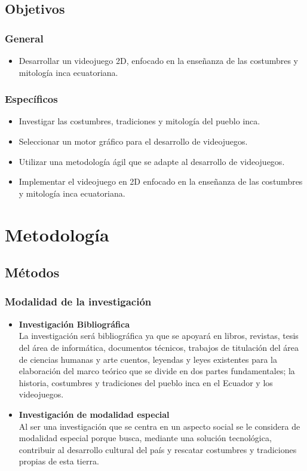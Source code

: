 \documentclass[a4paper, openright, 12pt]{report}
\begin{document}
\section{Objetivos}
\subsection{General}
\begin{itemize}
\item Desarrollar un videojuego 2D, enfocado en la enseñanza de las costumbres y mitología inca ecuatoriana.
\end{itemize}

\subsection{Específicos}
\begin{itemize}
\item Investigar las costumbres, tradiciones y mitología del pueblo inca.
\item Seleccionar un motor gráfico para el desarrollo de videojuegos.
\item Utilizar una metodología ágil que se adapte al desarrollo de videojuegos.
\item Implementar el videojuego en 2D enfocado en la enseñanza de las costumbres y mitología inca ecuatoriana.
\end{itemize}
\chapter{Metodología}
\section{Métodos}
\subsection{Modalidad de la investigación}
\begin{itemize}
\item \textbf{Investigación Bibliográfica}\\
La investigación será bibliográfica ya que se apoyará en libros, revistas, tesis del área de informática, documentos técnicos, trabajos de titulación del área de ciencias humanas y arte cuentos, leyendas y leyes existentes para la elaboración del marco teórico que se divide en dos partes fundamentales; la historia, costumbres y tradiciones del pueblo inca en el Ecuador y los videojuegos.

\item \textbf{Investigación de modalidad especial}\\
Al ser una investigación que se centra en un aspecto social se le considera de modalidad especial porque busca, mediante una solución tecnológica, contribuir al desarrollo cultural del país y rescatar costumbres y tradiciones propias de esta tierra.
\end{itemize}
\end{document}
